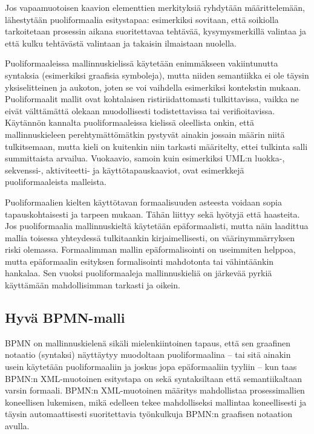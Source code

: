 \documentclass[
  finnish,
  letterpaper,
  DIV=11,
  numbers=noendperiod,
  oneside]{scrreprt}
\begin{document}
Jos vapaamuotoisen kaavion elementtien merkityksiä ryhdytään
määrittelemään, lähestytään puoliformaalia esitystapaa: esimerkiksi
sovitaan, että soikiolla tarkoitetaan prosessin aikana suoritettavaa
tehtävää, kysymysmerkillä valintaa ja että kulku tehtävästä valintaan ja
takaisin ilmaistaan nuolella.

Puoliformaaleissa mallinnuskielissä käytetään enimmäkseen vakiintunutta
syntaksia (esimerkiksi graafisia symboleja), mutta niiden semantiikka ei
ole täysin yksiselitteinen ja aukoton, joten se voi vaihdella
esimerkiksi kontekstin mukaan. Puoliformaalit mallit ovat kohtalaisen
ristiriidattomasti tulkittavissa, vaikka ne eivät välttämättä olekaan
muodollisesti todistettavissa tai verifioitavissa. Käytännön kannalta
puoliformaaleissa kielissä oleellista onkin, että mallinnuskieleen
perehtymättömätkin pystyvät ainakin jossain määrin niitä tulkitsemaan,
mutta kieli on kuitenkin niin tarkasti määritelty, ettei tulkinta salli
summittaista arvailua. Vuokaavio, samoin kuin esimerkiksi UML:n luokka-,
sekvenssi-, aktiviteetti- ja käyttötapauskaaviot, ovat esimerkkejä
puoliformaaleista malleista.

Puoliformaalien kielten käyttötavan formaalisuuden asteesta voidaan
sopia tapauskohtaisesti ja tarpeen mukaan. Tähän liittyy sekä hyötyjä
että haasteita. Jos puoliformaalia mallinnuskieltä käytetään
epäformaalisti, mutta näin laadittua mallia toisessa yhteydessä
tulkitaankin kirjaimellisesti, on väärinymmärryksen riski olemassa.
Formaalimman mallin epäformalisointi on useimmiten helppoa, mutta
epäformaalin esityksen formalisointi mahdotonta tai vähintäänkin
hankalaa. Sen vuoksi puoliformaaleja mallinnuskieliä on järkevää pyrkiä
käyttämään mahdollisimman tarkasti ja oikein.

\subsection{Hyvä BPMN-malli}\label{hyvuxe4-bpmn-malli}

BPMN on mallinnuskielenä sikäli mielenkiintoinen tapaus, että sen
graafinen notaatio (syntaksi) näyttäytyy muodoltaan puoliformaalina --
tai sitä ainakin usein käytetään puoliformaaliin ja joskus jopa
epäformaaliin tyyliin -- kun taas BPMN:n XML-muotoinen esitystapa on
sekä syntaksiltaan että semantiikaltaan varsin formaali. BPMN:n
XML-muotoinen määritys mahdollistaa prosessimallien koneellisen
lukemisen, mikä edelleen tekee mahdolliseksi mallintaa koneellisesti ja
täysin automaattisesti suoritettavia työnkulkuja BPMN:n graafisen
notaation avulla.
\end{document}
